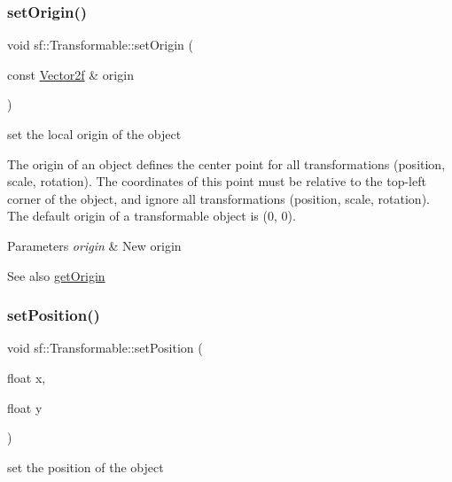 \subsubsection{\texorpdfstring{set\+Origin()}{setOrigin()}\hspace{0.1cm}{\footnotesize\ttfamily [2/2]}}
{\footnotesize\ttfamily void sf\+::\+Transformable\+::set\+Origin (\begin{DoxyParamCaption}\item[{const \hyperlink{classsf_1_1_vector2}{Vector2f} \&}]{origin }\end{DoxyParamCaption})}



set the local origin of the object 

The origin of an object defines the center point for all transformations (position, scale, rotation). The coordinates of this point must be relative to the top-\/left corner of the object, and ignore all transformations (position, scale, rotation). The default origin of a transformable object is (0, 0).


\begin{DoxyParams}{Parameters}
{\em origin} & New origin\\
\hline
\end{DoxyParams}
\begin{DoxySeeAlso}{See also}
\hyperlink{classsf_1_1_transformable_a37ea3500afac234814a43ce809ef264e}{get\+Origin} 
\end{DoxySeeAlso}
\mbox{\label{classsf_1_1_transformable_a4dbfb1a7c80688b0b4c477d706550208}} 
\subsubsection{\texorpdfstring{set\+Position()}{setPosition()}\hspace{0.1cm}{\footnotesize\ttfamily [1/2]}}
{\footnotesize\ttfamily void sf\+::\+Transformable\+::set\+Position (\begin{DoxyParamCaption}\item[{float}]{x,  }\item[{float}]{y }\end{DoxyParamCaption})}



set the position of the object 

